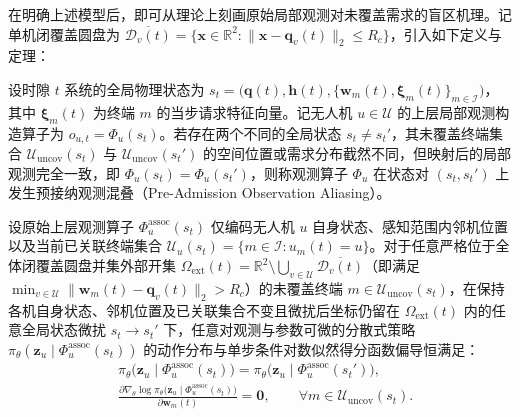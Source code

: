 在明确上述模型后，即可从理论上刻画原始局部观测对未覆盖需求的盲区机理。记单机闭覆盖圆盘为 $\overline{\mathcal{D}_v(t)}=\{\mathbf{x}\in\mathbb{R}^2:\|\mathbf{x}-\mathbf{q}_v(t)\|_2\le R_c\}$，引入如下定义与定理：

\begin{definition}[上层局部观测映射与预接纳观测混叠]
设时隙 $t$ 系统的全局物理状态为 $s_t=\big(\mathbf{q}(t),\allowbreak\mathbf{h}(t),\allowbreak\{\mathbf{w}_m(t),\boldsymbol{\xi}_m(t)\}_{m\in\mathcal{I}}\big)$，其中 $\boldsymbol{\xi}_m(t)$ 为终端 $m$ 的当步请求特征向量。记无人机 $u\in\mathcal{U}$ 的上层局部观测构造算子为 $o_{u,t}=\Phi_u(s_t)$。若存在两个不同的全局状态 $s_t\neq s_t'$，其未覆盖终端集合 $\mathcal{U}_{\mathrm{uncov}}(s_t)$ 与 $\mathcal{U}_{\mathrm{uncov}}(s_t')$ 的空间位置或需求分布截然不同，但映射后的局部观测完全一致，即 $\Phi_u(s_t)=\Phi_u(s_t')$，则称观测算子 $\Phi_u$ 在状态对 $(s_t,s_t')$ 上发生预接纳观测混叠（Pre-Admission Observation Aliasing）。
\end{definition}

\begin{theorem}[仅含已关联终端观测对未覆盖需求的策略梯度盲区性质]
设原始上层观测算子 $\Phi_u^{\mathrm{assoc}}(s_t)$ 仅编码无人机 $u$ 自身状态、感知范围内邻机位置以及当前已关联终端集合 $\mathcal{U}_u(s_t)=\{m\in\mathcal{I}:u_m(t)=u\}$。对于任意严格位于全体闭覆盖圆盘并集外部开集 $\Omega_{\mathrm{ext}}(t)=\mathbb{R}^2\setminus\bigcup_{v\in\mathcal{U}}\overline{\mathcal{D}_v(t)}$（即满足 $\min_{v\in\mathcal{U}}\|\mathbf{w}_m(t)-\mathbf{q}_v(t)\|_2>R_c$）的未覆盖终端 $m\in\mathcal{U}_{\mathrm{uncov}}(s_t)$，在保持各机自身状态、邻机位置及已关联集合不变且微扰后坐标仍留在 $\Omega_{\mathrm{ext}}(t)$ 内的任意全局状态微扰 $s_t\to s_t'$ 下，任意对观测与参数可微的分散式策略 $\pi_\theta(\mathbf{z}_u\mid\Phi_u^{\mathrm{assoc}}(s_t))$ 的动作分布与单步条件对数似然得分函数偏导恒满足：
\begin{equation}
    \begin{aligned}
    &\pi_\theta\big(\mathbf{z}_u\mid\Phi_u^{\mathrm{assoc}}(s_t)\big)=\pi_\theta\big(\mathbf{z}_u\mid\Phi_u^{\mathrm{assoc}}(s_t')\big),\\
    &\frac{\partial\nabla_\theta\log\pi_\theta\big(\mathbf{z}_u\mid\Phi_u^{\mathrm{assoc}}(s_t)\big)}{\partial\mathbf{w}_m(t)}=\mathbf{0},\qquad\forall m\in\mathcal{U}_{\mathrm{uncov}}(s_t).
    \end{aligned}
    \label{eq:ch3-aliasing-theorem}
\end{equation}
\end{theorem}

